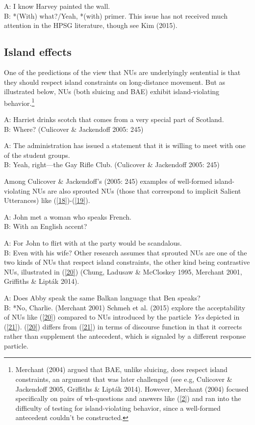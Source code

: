 \documentclass[output=paper
                ,modfonts
                ,nonflat
	        ,collection
	        ,collectionchapter
	        ,collectiontoclongg
 	        ,biblatex
                ,babelshorthands
                ,newtxmath
                ,draftmode
                ,colorlinks, citecolor=brown
]{./langsci/langscibook}
\begin{document}
{ \ea A: I know Harvey painted the wall.\\B: *(With) what?/Yeah, *(with) primer.\label{15}\z
This issue has not received much attention in the HPSG literature, though see Kim (2015).


\subsection{Island effects}
One of the predictions of the view that NUs are underlyingly sentential is that they should respect island constraints on long-distance movement. But as illustrated below, NUs (both sluicing and BAE) exhibit island-violating behavior.\footnote{Merchant (2004) argued that BAE, unlike sluicing, does respect island constraints, an argument that was later challenged (see e.g, Culicover \& Jackendoff 2005, Griffiths \& Lipt\'{a}k 2014). However, Merchant (2004) focused specifically on pairs of wh-questions and answers like (\ref{2}) and ran into the difficulty of testing for island-violating behavior, since a well-formed antecedent couldn't be constructed.}

\ea A: Harriet drinks scotch that comes from a very special part of Scotland.\\B: Where? (Culicover \& Jackendoff 2005: 245) \label{16}\z

\ea A: The administration has issued a statement that it is willing to meet with one of the student groups.\\B: Yeah, right---the Gay Rifle Club. (Culicover \& Jackendoff 2005: 245) \label{17}\z

Among Culicover \& Jackendoff's (2005: 245) examples of well-formed island-violating NUs are also sprouted NUs (those that correspond to implicit Salient Utterances) like (\ref{18})-(\ref{19}).

\ea A: John met a woman who speaks French.\\B: With an English accent?\label{18}\z

\ea A: For John to flirt with at the party would be scandalous. \\B: Even with his wife?\label{19}\z
Other research assumes that sprouted NUs are one of the two kinds of NUs that respect island constraints, the other kind being contrastive NUs, illustrated in (\ref{20}) (Chung,
Ladusaw \& McCloskey 1995, Merchant 2001, Griffiths \& Lipt\'{a}k 2014).

\ea A: Does Abby speak the same Balkan language that Ben speaks?\\B: *No, Charlie. (Merchant 2001)  \label{20}\z
 Schmeh et al. (2015) explore the acceptability of NUs like (\ref{20}) compared to NUs introduced by the particle {\it Yes} depicted in (\ref{21}). (\ref{20}) differs from (\ref{21}) in terms of discourse function in that it corrects rather than supplement the antecedent, which is signaled by a different response particle.

}
\end{document}
